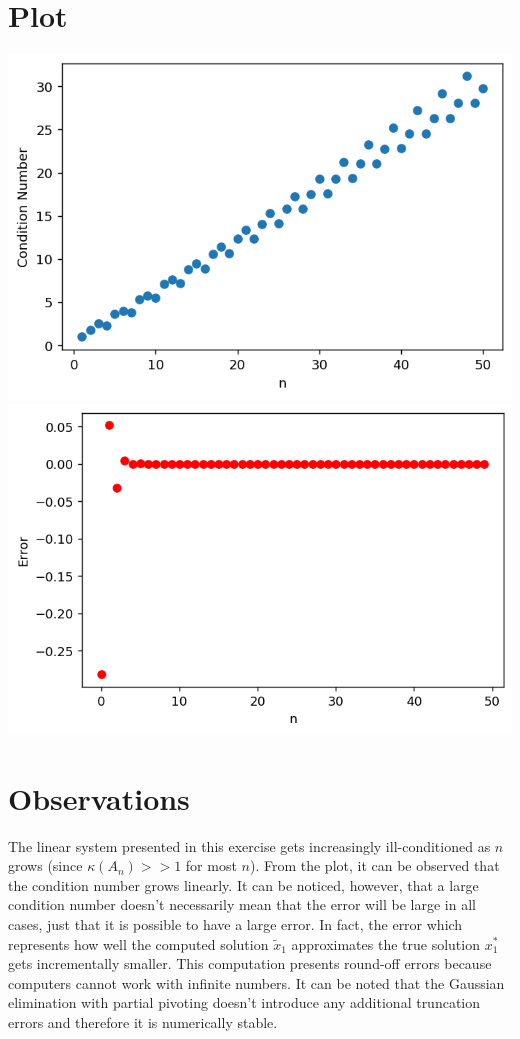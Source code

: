 \documentclass{article}
\begin{document}
\section{Plot}
\includegraphics[width=\textwidth,height=\textheight,keepaspectratio]{cond_number.png}
\includegraphics[width=\textwidth,height=\textheight,keepaspectratio]{error.png}

\section{Observations}
The linear system presented in this exercise gets increasingly ill-conditioned as $n$ grows (since $\kappa(A_n)>> 1$ for most $n$). From the plot, it can be observed that the condition number grows linearly. It can be noticed, however, that a large condition number doesn’t necessarily mean that the error will be large in all cases, just that it is possible to have a large error. In fact, the error which represents how well the computed solution $\widetilde{x}_1$ approximates the true solution $x_1^{\ast}$ gets incrementally smaller. This computation presents round-off errors because computers cannot work with infinite numbers. It can be noted that the Gaussian elimination with partial pivoting doesn't introduce any additional truncation errors and therefore it is numerically stable.\\
\end{document}
